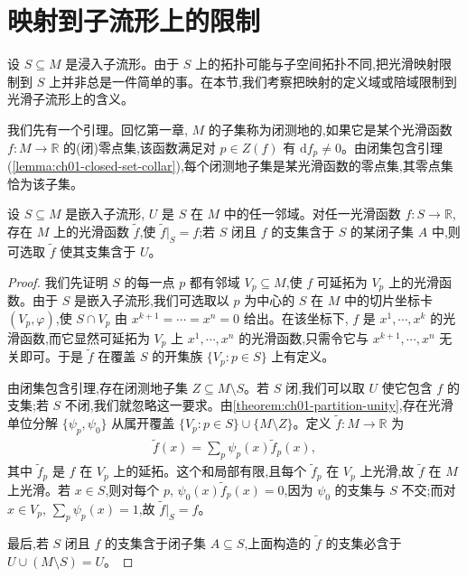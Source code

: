 \documentclass[../../main.tex]{subfiles}
\begin{document}
\section{映射到子流形上的限制}\label{section:ch05-限制映射到子流形}

设 $S\subseteq M$ 是浸入子流形。由于 $S$ 上的拓扑可能与子空间拓扑不同,把光滑映射限制到 $S$ 上并非总是一件简单的事。在本节,我们考察把映射的定义域或陪域限制到光滑子流形上的含义。

我们先有一个引理。回忆第一章, $M$ 的子集称为闭测地的,如果它是某个光滑函数 $f:M\to\mathbb{R}$ 的(闭)零点集,该函数满足对 $p\in Z(f)$ 有 $\mathrm{d}f_p\neq 0$。由闭集包含引理(\cref{lemma:ch01-closed-set-collar}),每个闭测地子集是某光滑函数的零点集,其零点集恰为该子集。

\begin{lemma}\label{lemma:ch05-extension}
设 $S\subseteq M$ 是嵌入子流形, $U$ 是 $S$ 在 $M$ 中的任一邻域。对任一光滑函数 $f:S\to\mathbb{R}$,存在 $M$ 上的光滑函数 $\widetilde{f}$,使 $\widetilde{f}|_S=f$;若 $S$ 闭且 $f$ 的支集含于 $S$ 的某闭子集 $A$ 中,则可选取 $\widetilde{f}$ 使其支集含于 $U$。
\end{lemma}

\begin{proof}
我们先证明 $S$ 的每一点 $p$ 都有邻域 $V_p\subseteq M$,使 $f$ 可延拓为 $V_p$ 上的光滑函数。由于 $S$ 是嵌入子流形,我们可选取以 $p$ 为中心的 $S$ 在 $M$ 中的切片坐标卡 $(V_p,\varphi)$,使 $S\cap V_p$ 由 $x^{k+1}=\cdots=x^n=0$ 给出。在该坐标下, $f$ 是 $x^1,\cdots ,x^k$ 的光滑函数,而它显然可延拓为 $V_p$ 上 $x^1,\cdots ,x^n$ 的光滑函数,只需令它与 $x^{k+1},\cdots ,x^n$ 无关即可。于是 $\widetilde{f}$ 在覆盖 $S$ 的开集族 $\{V_p:p\in S\}$ 上有定义。

由闭集包含引理,存在闭测地子集 $Z\subseteq M\setminus S$。若 $S$ 闭,我们可以取 $U$ 使它包含 $f$ 的支集;若 $S$ 不闭,我们就忽略这一要求。由\cref{theorem:ch01-partition-unity},存在光滑单位分解 $\{\psi_p,\psi_0\}$ 从属开覆盖 $\{V_p:p\in S\}\cup\{M\setminus Z\}$。定义 $\widetilde{f}:M\to\mathbb{R}$ 为
\begin{align*}
\widetilde{f}(x)=\sum_p \psi_p(x)\widetilde{f}_p(x),
\end{align*}
其中 $\widetilde{f}_p$ 是 $f$ 在 $V_p$ 上的延拓。这个和局部有限,且每个 $\widetilde{f}_p$ 在 $V_p$ 上光滑,故 $\widetilde{f}$ 在 $M$ 上光滑。若 $x\in S$,则对每个 $p$, $\psi_0(x)\widetilde{f}_p(x)=0$,因为 $\psi_0$ 的支集与 $S$ 不交;而对 $x\in V_p$, $\sum_p\psi_p(x)=1$,故 $\widetilde{f}|_S=f$。

最后,若 $S$ 闭且 $f$ 的支集含于闭子集 $A\subseteq S$,上面构造的 $\widetilde{f}$ 的支集必含于 $U\cup(M\setminus S)=U$。
\end{proof}
\end{document}
